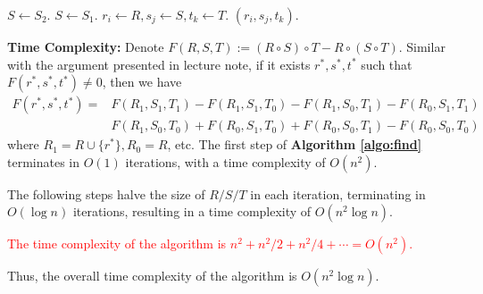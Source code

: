 \begin{answer}
\begin{enumerate}[label=\alph*).]
\begin{algo}
\begin{algorithmic}[1]
						\State $S \leftarrow S_2$.
					\Else
						\State $S \leftarrow S_1$.
					\EndIf
				\EndWhile
				\State $r_i \leftarrow R, s_j \leftarrow S, t_k \leftarrow T$. 
				\State \Return $(r_i, s_j, t_k)$.
			\end{algorithmic}
		\end{algo}
		\textbf{Time Complexity:} Denote $F(R, S, T) := (R\circ S)\circ T - R\circ(S\circ T)$. 
		Similar with the argument presented in lecture note, if it exists $r^*, s^*, t^*$ such that $F(r^*, s^*, t^*)\neq 0$, then 
		we have 
		\begin{align*}
			F(r^*, s^*, t^*) = &F(R_1, S_1, T_1) - F(R_1, S_1, T_0) - F(R_1, S_0, T_1)  - F(R_0, S_1, T_1) \\
			& F(R_1, S_0, T_0) + F(R_0, S_1, T_0) + F(R_0, S_0, T_1) - F(R_0, S_0, T_0) 
		\end{align*}
		where $R_1 = R \cup \{r^*\}, R_0 = R$, etc. The first step of \textbf{Algorithm \ref{algo:find}} terminates in $O(1)$ iterations, with a time complexity of $O(n^2)$. 

		The following steps halve the size of $R/S/T$ in each iteration, terminating in $O(\log n)$ iterations, resulting in a time complexity of $O(n^2\log n)$. 

		\textcolor{red}{The time complexity of the algorithm is $n^2 + n^2/2 + n^2/4 + \cdots = O(n^2)$.}
		
		Thus, the overall time complexity of the algorithm is $O(n^2\log n)$.
	\end{enumerate}
	\ed
\end{answer}